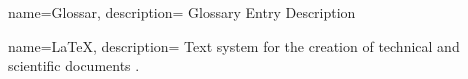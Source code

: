 \renewcommand*{\glstextformat}[1]{\textcolor{linkRed}{#1}}
\makeglossaries

{
    name={Glossar},
    description={
    Glossary Entry Description
}
}

{
    name={\LaTeX},
    description={
        Text system for the creation of technical and scientific documents \cite{latex-project}.
}
} 